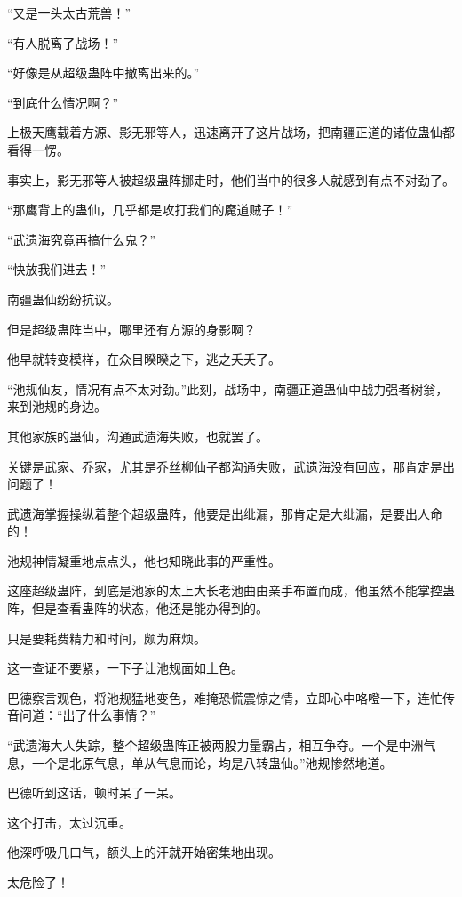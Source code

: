 
\begin{this_body}

“又是一头太古荒兽！”

“有人脱离了战场！”

“好像是从超级蛊阵中撤离出来的。”

“到底什么情况啊？”

上极天鹰载着方源、影无邪等人，迅速离开了这片战场，把南疆正道的诸位蛊仙都看得一愣。

事实上，影无邪等人被超级蛊阵挪走时，他们当中的很多人就感到有点不对劲了。

“那鹰背上的蛊仙，几乎都是攻打我们的魔道贼子！”

“武遗海究竟再搞什么鬼？”

“快放我们进去！”

南疆蛊仙纷纷抗议。

但是超级蛊阵当中，哪里还有方源的身影啊？

他早就转变模样，在众目睽睽之下，逃之夭夭了。

“池规仙友，情况有点不太对劲。”此刻，战场中，南疆正道蛊仙中战力强者树翁，来到池规的身边。

其他家族的蛊仙，沟通武遗海失败，也就罢了。

关键是武家、乔家，尤其是乔丝柳仙子都沟通失败，武遗海没有回应，那肯定是出问题了！

武遗海掌握操纵着整个超级蛊阵，他要是出纰漏，那肯定是大纰漏，是要出人命的！

池规神情凝重地点点头，他也知晓此事的严重性。

这座超级蛊阵，到底是池家的太上大长老池曲由亲手布置而成，他虽然不能掌控蛊阵，但是查看蛊阵的状态，他还是能办得到的。

只是要耗费精力和时间，颇为麻烦。

这一查证不要紧，一下子让池规面如土色。

巴德察言观色，将池规猛地变色，难掩恐慌震惊之情，立即心中咯噔一下，连忙传音问道：“出了什么事情？”

“武遗海大人失踪，整个超级蛊阵正被两股力量霸占，相互争夺。一个是中洲气息，一个是北原气息，单从气息而论，均是八转蛊仙。”池规惨然地道。

巴德听到这话，顿时呆了一呆。

这个打击，太过沉重。

他深呼吸几口气，额头上的汗就开始密集地出现。

太危险了！


\end{this_body}
